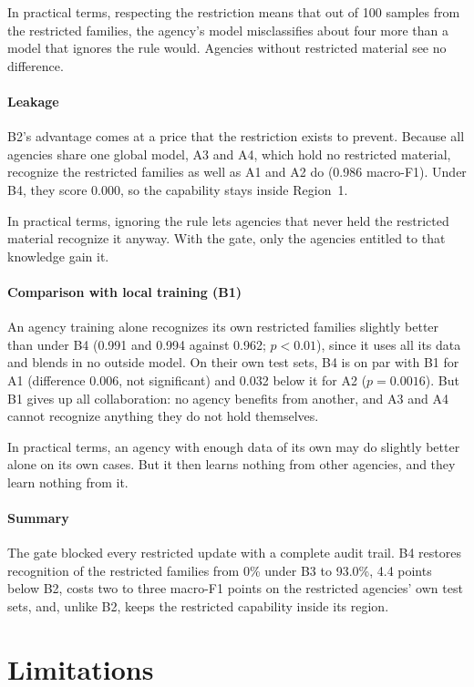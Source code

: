 In practical terms, respecting the restriction means that out of 100 samples from the restricted families, the agency's model misclassifies about four more than a model that ignores the rule would. Agencies without restricted material see no difference.

\paragraph{Leakage}
B2's advantage comes at a price that the restriction exists to prevent. Because all agencies share one global model, A3 and A4, which hold no restricted material, recognize the restricted families as well as A1 and A2 do (0.986 macro-F1). Under B4, they score 0.000, so the capability stays inside Region~1.

In practical terms, ignoring the rule lets agencies that never held the restricted material recognize it anyway. With the gate, only the agencies entitled to that knowledge gain it.


\paragraph{Comparison with local training (B1)}
An agency training alone recognizes its own restricted families slightly better than under B4 (0.991 and 0.994 against 0.962; $p<0.01$), since it uses all its data and blends in no outside model. On their own test sets, B4 is on par with B1 for A1 (difference 0.006, not significant) and 0.032 below it for A2 ($p=0.0016$). But B1 gives up all collaboration: no agency benefits from another, and A3 and A4 cannot recognize anything they do not hold themselves.

In practical terms, an agency with enough data of its own may do slightly better alone on its own cases. But it then learns nothing from other agencies, and they learn nothing from it.


\paragraph{Summary}
The gate blocked every restricted update with a complete audit trail. B4 restores recognition of the restricted families from 0\% under B3 to 93.0\%, 4.4 points below B2, costs two to three macro-F1 points on the restricted agencies' own test sets, and, unlike B2, keeps the restricted capability inside its region.


\section{Limitations}
\label{sec:limitations}

